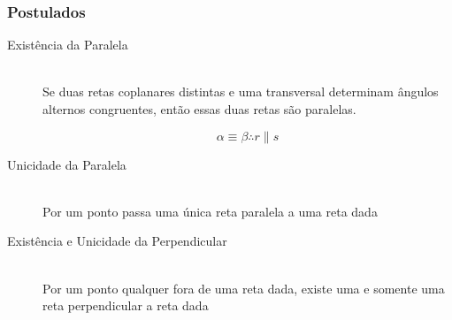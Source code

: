     \subsubsection{Postulados}
        \begin{description}
            \item[Existência da Paralela] \hfill \\
                Se duas retas coplanares distintas e uma transversal determinam ângulos alternos congruentes, então essas duas retas são paralelas. \eg
                \begin{center}
                \end{center}
                \[ \alpha \equiv \beta \therefore r \parallel s \]
            \item[Unicidade da Paralela] \hfill \\
                Por um ponto passa uma única reta paralela a uma reta dada
            \item[Existência e Unicidade da Perpendicular] \hfill \\
                Por um ponto qualquer fora de uma reta dada, existe uma e somente uma reta perpendicular a reta dada
        \end{description}
